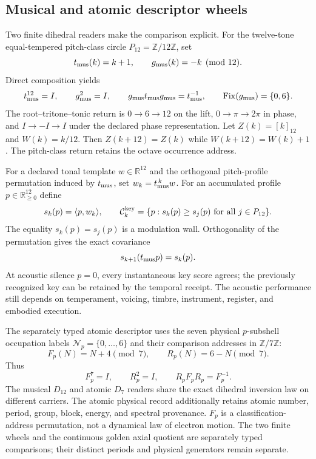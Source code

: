 \documentclass[10pt]{article}
\begin{document}
\subsection*{Musical and atomic descriptor wheels}
Two finite dihedral readers make the comparison explicit. For the twelve-tone equal-tempered pitch-class circle
$P_{12}=\mathbb Z/12\mathbb Z$, set
\begin{equation}
t_{\rm mus}(k)=k+1,\qquad g_{\rm mus}(k)=-k\pmod{12}.
\end{equation}
Direct composition yields
\begin{equation}
t_{\rm mus}^{12}=I,\qquad g_{\rm mus}^2=I,\qquad
g_{\rm mus}t_{\rm mus}g_{\rm mus}=t_{\rm mus}^{-1},
\qquad\operatorname{Fix}(g_{\rm mus})=\{0,6\}.
\end{equation}
The root--tritone--tonic return is $0\to6\to12$ on the lift,
$0\to\pi\to2\pi$ in phase, and $I\to-I\to I$ under the
declared phase representation. Let $Z(k)=[k]_{12}$ and $W(k)=k/12$.
Then $Z(k+12)=Z(k)$ while $W(k+12)=W(k)+1$.
The pitch-class return retains the octave occurrence address.

For a declared tonal template $w\in\mathbb R^{12}$ and the orthogonal
pitch-profile permutation induced by $t_{\rm mus}$, set
$w_k=t_{\rm mus}^{\,k}w$. For an accumulated profile
$p\in\mathbb R_{\ge0}^{12}$ define
\begin{equation}
s_k(p)=\langle p,w_k\rangle,\qquad
\mathcal C_k^{\rm key}
=\{p:s_k(p)\ge s_j(p)\ \text{for all }j\in P_{12}\}.
\end{equation}
The equality $s_k(p)=s_j(p)$ is a modulation wall. Orthogonality of
the permutation gives the exact covariance
\begin{equation}
s_{k+1}(t_{\rm mus}p)=s_k(p).
\end{equation}
At acoustic silence $p=0$, every instantaneous key score agrees;
the previously recognized key can be retained by the temporal receipt.
The acoustic performance still depends on temperament, voicing, timbre,
instrument, register, and embodied execution.

The separately typed atomic descriptor uses the seven physical
$p$-subshell occupation labels $\mathcal N_p=\{0,\ldots,6\}$ and their
comparison addresses in $\mathbb Z/7\mathbb Z$:
\begin{equation}
F_p(N)=N+4\pmod7,\qquad R_p(N)=6-N\pmod7.
\end{equation}
Thus
\begin{equation}
F_p^7=I,\qquad R_p^2=I,\qquad R_pF_pR_p=F_p^{-1}.
\end{equation}
The musical $D_{12}$ and atomic $D_7$ readers share the exact
dihedral inversion law on different carriers. The atomic physical
record additionally retains atomic number, period, group, block,
energy, and spectral provenance. $F_p$ is a classification-address
permutation, not a dynamical law of electron motion. The two finite
wheels and the continuous golden axial quotient are separately typed
comparisons; their distinct periods and physical generators remain
separate.
\end{document}
